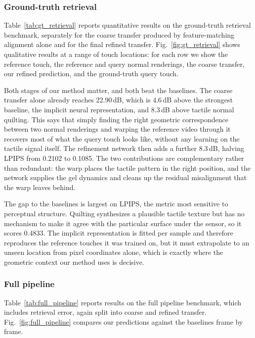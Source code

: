 \subsubsection{Ground-truth retrieval}



Table~\ref{tab:gt_retrieval} reports quantitative results on the ground-truth retrieval benchmark,
separately for the coarse transfer produced by feature-matching alignment alone and for the final
refined transfer. Fig.~\ref{fig:gt_retrieval} shows qualitative results at a range of touch
locations: for each row we show the reference touch, the reference and query normal renderings,
the coarse transfer, our refined prediction, and the ground-truth query touch.



Both stages of our method matter, and both beat the baselines. The coarse transfer alone already
reaches 22.90\,dB, which is 4.6\,dB above the strongest baseline, the implicit neural
representation, and 8.3\,dB above tactile normal quilting. This says that simply finding the right
geometric correspondence between two normal renderings and warping the reference video through it
recovers most of what the query touch looks like, without any learning on the tactile signal
itself. The refinement network then adds a further 8.3\,dB, halving LPIPS from 0.2102 to 0.1085.
The two contributions are complementary rather than redundant: the warp places the tactile pattern
in the right position, and the network supplies the gel dynamics and cleans up the residual
misalignment that the warp leaves behind.

The gap to the baselines is largest on LPIPS, the metric most sensitive to perceptual structure.
Quilting synthesizes a plausible tactile texture but has no mechanism to make it agree with the
particular surface under the sensor, so it scores 0.4833. The implicit representation is fitted
per sample and therefore reproduces the reference touches it was trained on, but it must
extrapolate to an unseen location from pixel coordinates alone, which is exactly where the
geometric context our method uses is decisive.

\subsubsection{Full pipeline}



Table~\ref{tab:full_pipeline} reports results on the full pipeline benchmark, which includes
retrieval error, again split into coarse and refined transfer.
Fig.~\ref{fig:full_pipeline} compares our predictions against the baselines frame by frame.

